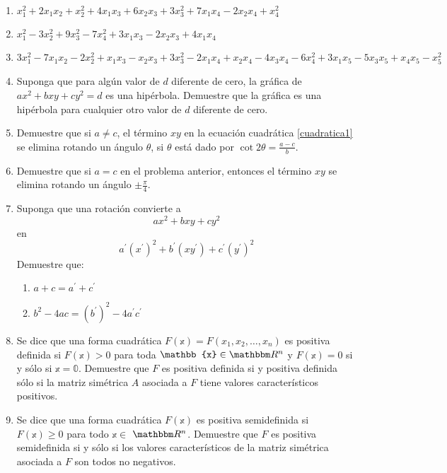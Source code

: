 \begin{enumerate}[resume]
    \item $x_{1}^{2}+2 x_{1} x_{2}+x_{2}^{2}+4 x_{1} x_{3}+6 x_{2} x_{3}+3 x_{3}^{2}+7 x_{1} x_{4}-2 x_{2} x_{4}+x_{4}^{2}$
    \item $x_{1}^{2}-3 x_{2}^{2}+9 x_{3}^{2}-7 x_{4}^{2}+3 x_{1} x_{3}-2 x_{2} x_{3}+4 x_{1} x_{4}$
    \item $3 x_{1}^{2}-7 x_{1} x_{2}-2 x_{2}^{2}+x_{1} x_{3}-x_{2} x_{3}+3 x_{3}^{2}-2 x_{1} x_{4}+x_{2} x_{4}-4 x_{3} x_{4}-6 x_{4}^{2}+3 x_{1} x_{5}-5 x_{3} x_{5}+x_{4} x_{5}-x_{5}^{2}$
    \item Suponga que para algún valor de $d$ diferente de cero, la gráfica de $a x^{2}+b x y+c y^{2}=d$ es una hipérbola. Demuestre que la gráfica es una hipérbola para cualquier otro valor de $d$ diferente de cero.
    \item Demuestre que si $a \neq c$, el término $x y$ en la ecuación cuadrática \eqref{cuadratica1} se elimina rotando un ángulo $\theta$, si $\theta$ está dado por $\displaystyle\cot 2 \theta=\frac{a-c}{b}$.
    \item Demuestre que si $a=c$ en el problema anterior, entonces el término $x y$ se elimina rotando un ángulo $\displaystyle\pm \frac{\pi}{4}$.
    \item Suponga que una rotación convierte a
    $$a x^{2}+b x y+c y^{2}$$
    en $$a^{\prime}\left(x^{\prime}\right)^{2}+b^{\prime}\left(x y^{\prime}\right)+c^{\prime}\left(y^{\prime}\right)^{2}$$
    Demuestre que:
    \begin{enumerate}
        \item $a+c=a^{\prime}+c^{\prime}$
        \item $b^{2}-4 a c=\left(b^{\prime}\right)^{2}-4 a^{\prime} c^{\prime}$
    \end{enumerate}\newpage
    \item Se dice que una forma cuadrática $F(\mathbb{x})=F\left(x_{1}, x_{2}, \ldots, x_{n}\right)$ es positiva definida si $F(\mathbb{x})>0$ para toda $\mathbb{x} \in \RR[n]$ y $F(\mathbb{x})=0$ si y sólo si $\mathbb{x} = \mathbb{0}$. Demuestre que $F$ es positiva definida si y positiva definida sólo si la matriz simétrica $A$ asociada a $F$ tiene valores característicos positivos.
    \item Se dice que una forma cuadrática $F(\mathbb{x})$ es positiva semidefinida si $F(\mathbb{x}) \geq 0$ para todo $\mathbb{x} \in$ $\RR[n]$. Demuestre que $F$ es positiva semidefinida si y sólo si los valores característicos de la matriz simétrica asociada a $F$ son todos no negativos.
\end{enumerate}
